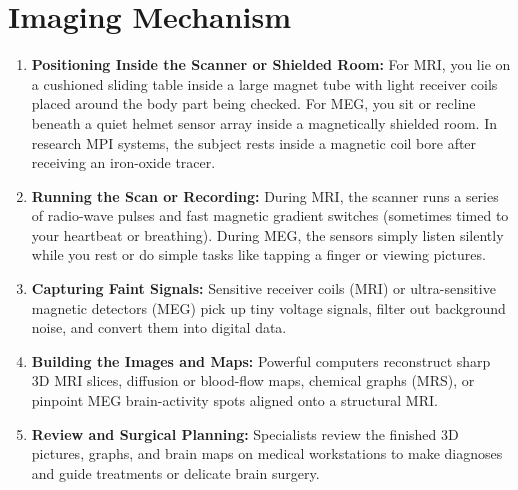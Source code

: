 \section{Imaging Mechanism}
\begin{enumerate}
  \item \textbf{Positioning Inside the Scanner or Shielded Room:} For MRI, you lie on a cushioned sliding table inside a large magnet tube with light receiver coils placed around the body part being checked. For MEG, you sit or recline beneath a quiet helmet sensor array inside a magnetically shielded room. In research MPI systems, the subject rests inside a magnetic coil bore after receiving an iron-oxide tracer.
  \item \textbf{Running the Scan or Recording:} During MRI, the scanner runs a series of radio-wave pulses and fast magnetic gradient switches (sometimes timed to your heartbeat or breathing). During MEG, the sensors simply listen silently while you rest or do simple tasks like tapping a finger or viewing pictures.
  \item \textbf{Capturing Faint Signals:} Sensitive receiver coils (MRI) or ultra-sensitive magnetic detectors (MEG) pick up tiny voltage signals, filter out background noise, and convert them into digital data.
  \item \textbf{Building the Images and Maps:} Powerful computers reconstruct sharp 3D MRI slices, diffusion or blood-flow maps, chemical graphs (MRS), or pinpoint MEG brain-activity spots aligned onto a structural MRI.
  \item \textbf{Review and Surgical Planning:} Specialists review the finished 3D pictures, graphs, and brain maps on medical workstations to make diagnoses and guide treatments or delicate brain surgery.
\end{enumerate}

